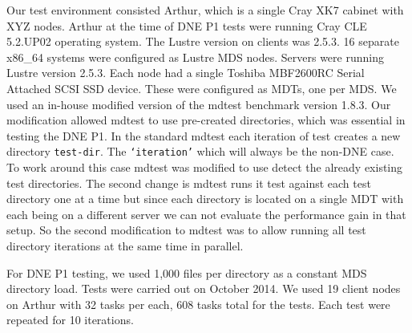 \documentclass[conference,compsoc]{IEEEtran}
\begin{document}
Our test environment consisted Arthur, which is a single Cray XK7 cabinet with
XYZ nodes. Arthur at the time of DNE P1 tests were running Cray CLE 5.2.UP02
operating system. The Lustre version on clients was 2.5.3. 16 separate x86\_64
systems were configured as Lustre MDS nodes. Servers were running Lustre
version 2.5.3. Each node had a single Toshiba MBF2600RC Serial Attached SCSI
SSD device. These were configured as MDTs, one per MDS.  We used an in-house
modified version of the mdtest benchmark version 1.8.3. Our modification
allowed mdtest to use pre-created directories, which was essential in testing
the DNE P1. In the standard mdtest each iteration of test creates a new
directory {\footnotesize{\texttt{test-dir}}}. The
{\footnotesize{\texttt{`iteration'}}} which will always be the non-DNE case. To
work around this case mdtest was modified to use detect the already existing
test directories. The second change is mdtest runs it test against each test
directory one at  a time but since each directory is located on a single MDT
with each being on a different server we can not evaluate the performance gain
in that setup. So the second modification to mdtest was to allow running all
test directory iterations at the same time in parallel. 


For DNE P1 testing, we used 1,000 files per directory as a constant MDS
directory load. Tests were carried out on October 2014. We used 19 client nodes
on Arthur with 32 tasks per each, 608 tasks total for the tests. Each test were
repeated for 10 iterations. 

\end{document}

